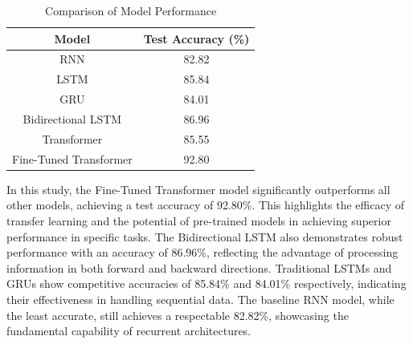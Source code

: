 \documentclass{article}
\begin{document}
\begin{table}[H]
\centering
\begin{tabular}{|c|c|}
\hline
\textbf{Model} & \textbf{Test Accuracy (\%)} \\
\hline
RNN & 82.82 \\
LSTM & 85.84 \\
GRU & 84.01 \\
Bidirectional LSTM & 86.96 \\
Transformer & 85.55 \\
Fine-Tuned Transformer & 92.80 \\
\hline
\end{tabular}
\caption{Comparison of Model Performance}
\label{table:model-results}
\end{table}
In this study, the Fine-Tuned Transformer model significantly outperforms all other models, achieving a test accuracy of 92.80\%. This highlights the efficacy of transfer learning and the potential of pre-trained models in achieving superior performance in specific tasks. The Bidirectional LSTM also demonstrates robust performance with an accuracy of 86.96\%, reflecting the advantage of processing information in both forward and backward directions. Traditional LSTMs and GRUs show competitive accuracies of 85.84\% and 84.01\% respectively, indicating their effectiveness in handling sequential data. The baseline RNN model, while the least accurate, still achieves a respectable 82.82\%, showcasing the fundamental capability of recurrent architectures.
\end{document}
